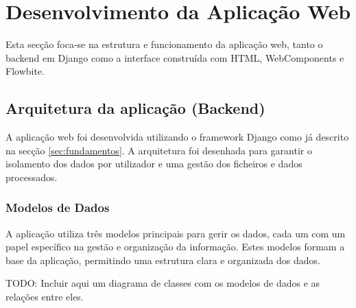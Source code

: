 \section{Desenvolvimento da Aplicação Web}

Esta secção foca-se na estrutura e funcionamento da aplicação web, tanto o backend em Django como a interface construída com HTML, WebComponents e Flowbite.

\subsection{Arquitetura da aplicação (Backend)}

A aplicação web foi desenvolvida utilizando o framework Django como já descrito na secção \ref{sec:fundamentos}. A arquitetura foi desenhada para garantir o isolamento dos dados por utilizador e uma gestão dos ficheiros e dados processados.

\subsubsection{Modelos de Dados}

A aplicação utiliza três modelos principais para gerir os dados, cada um com um papel específico na gestão e organização da informação. Estes modelos formam a base da aplicação, permitindo uma estrutura clara e organizada dos dados.

TODO: Incluir aqui um diagrama de classes com os modelos de dados e as relações entre eles.

